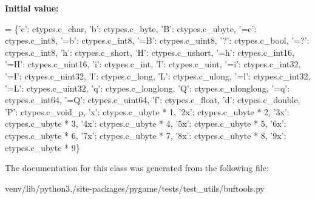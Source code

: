 {\bfseries Initial value\+:}
\begin{DoxyCode}
=  \{\textcolor{stringliteral}{'c'}: ctypes.c\_char, \textcolor{stringliteral}{'b'}: ctypes.c\_byte, \textcolor{stringliteral}{'B'}: ctypes.c\_ubyte,
             \textcolor{stringliteral}{'=c'}: ctypes.c\_int8, \textcolor{stringliteral}{'=b'}: ctypes.c\_int8, \textcolor{stringliteral}{'=B'}: ctypes.c\_uint8,
             \textcolor{stringliteral}{'?'}: ctypes.c\_bool, \textcolor{stringliteral}{'=?'}: ctypes.c\_int8,
             \textcolor{stringliteral}{'h'}: ctypes.c\_short, \textcolor{stringliteral}{'H'}: ctypes.c\_ushort,
             \textcolor{stringliteral}{'=h'}: ctypes.c\_int16, \textcolor{stringliteral}{'=H'}: ctypes.c\_uint16,
             \textcolor{stringliteral}{'i'}: ctypes.c\_int, \textcolor{stringliteral}{'I'}: ctypes.c\_uint,
             \textcolor{stringliteral}{'=i'}: ctypes.c\_int32, \textcolor{stringliteral}{'=I'}: ctypes.c\_uint32,
             \textcolor{stringliteral}{'l'}: ctypes.c\_long, \textcolor{stringliteral}{'L'}: ctypes.c\_ulong,
             \textcolor{stringliteral}{'=l'}: ctypes.c\_int32, \textcolor{stringliteral}{'=L'}: ctypes.c\_uint32,
             \textcolor{stringliteral}{'q'}: ctypes.c\_longlong, \textcolor{stringliteral}{'Q'}: ctypes.c\_ulonglong,
             \textcolor{stringliteral}{'=q'}: ctypes.c\_int64, \textcolor{stringliteral}{'=Q'}: ctypes.c\_uint64,
             \textcolor{stringliteral}{'f'}: ctypes.c\_float, \textcolor{stringliteral}{'d'}: ctypes.c\_double,
             \textcolor{stringliteral}{'P'}: ctypes.c\_void\_p,
             \textcolor{stringliteral}{'x'}: ctypes.c\_ubyte * 1,
             \textcolor{stringliteral}{'2x'}: ctypes.c\_ubyte * 2,
             \textcolor{stringliteral}{'3x'}: ctypes.c\_ubyte * 3,
             \textcolor{stringliteral}{'4x'}: ctypes.c\_ubyte * 4,
             \textcolor{stringliteral}{'5x'}: ctypes.c\_ubyte * 5,
             \textcolor{stringliteral}{'6x'}: ctypes.c\_ubyte * 6,
             \textcolor{stringliteral}{'7x'}: ctypes.c\_ubyte * 7,
             \textcolor{stringliteral}{'8x'}: ctypes.c\_ubyte * 8,
             \textcolor{stringliteral}{'9x'}: ctypes.c\_ubyte * 9\}
\end{DoxyCode}


The documentation for this class was generated from the following file\+:\begin{DoxyCompactItemize}
\item 
venv/lib/python3./site-\/packages/pygame/tests/test\+\_\+utils/buftools.\+py\end{DoxyCompactItemize}
